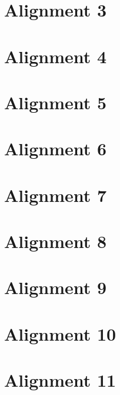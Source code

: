 \documentclass{scrartcl}
\begin{document}
\section{Alignment 3}
\label{sec:align_3}
\clearpage

\section{Alignment 4}
\label{sec:align_4}
\clearpage

\section{Alignment 5}
\label{sec:align_5}
\clearpage

\section{Alignment 6}
\label{sec:align_6}
\clearpage

\section{Alignment 7}
\label{sec:align_7}
\clearpage

\section{Alignment 8}
\label{sec:align_8}
\clearpage

\section{Alignment 9}
\label{sec:align_9}
\clearpage

\section{Alignment 10}
\label{sec:align_10}
\clearpage

\section{Alignment 11}
\label{sec:align_11}
\clearpage
\end{document}
